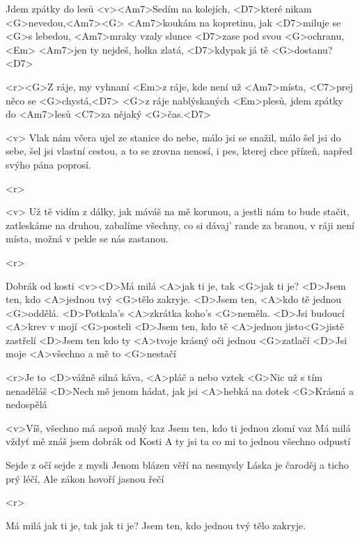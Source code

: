 \begin{song}{79}{Jdem zpátky do lesů}{}
	<v><Am7>Sedím na kolejích, <D7>které nikam <G>nevedou,<Am7><G>
	<Am7>koukám na kopretinu, jak <D7>miluje se <G>s lebedou,
	<Am7>mraky vzaly slunce <D7>zase pod svou <G>ochranu,<Em>
	<Am7>jen ty nejdeš, holka zlatá, <D7>kdypak já tě <G>dostanu? <D7>

	<r><G>Z ráje, my vyhnaní <Em>z ráje,
	kde není už <Am7>místa, <C7>prej něco se <G>chystá,<D7>
	<G>z ráje nablýskaných <Em>plesů,
	jdem zpátky do <Am7>lesů <C7>za nějaký <G>čas.<D7>

	<v> Vlak nám včera ujel ze stanice do nebe,
	málo jsi se snažil, málo šel jsi do sebe,
	šel jsi vlastní cestou, a to se zrovna nenosí,
	i pes, kterej chce přízeň, napřed svýho pána poprosí.

	<r>

	<v> Už tě vidím z dálky, jak máváš na mě korunou,
	a jestli nám to bude stačit, zatleskáme na druhou,
	zabalíme všechny, co si dávaj' rande za branou,
	v ráji není místa, možná v pekle se nás zastanou.

	<r>
\end{song}

\begin{song}[Chinaski]{82}{Dobrák od kosti}{}
	<v><D>Má milá <A>jak ti je, tak <G>jak ti je?
	<D>Jsem ten, kdo <A>jednou tvý <G>tělo zakryje.
	<D>Jsem ten, <A>kdo tě jednou <G>oddělá.
	<D>Potkala's <A>zkrátka koho's <G>neměla.
	<D>Jsi budoucí <A>krev v mojí <G>posteli
	<D>Jsem ten, kdo tě <A>jednou jisto<G>jistě zastřelí
	<D>Jsem ten kdo ty <A>tvoje krásný oči jednou <G>zatlačí
	<D>Jsi moje <A>všechno a mě to <G>nestačí

	<r>Je to <D>vážně silná káva, <A>pláč a nebo vztek
	<G>Nic už s tím nenaděláš
	<D>Nech mě jenom hádat, jak jsi <A>hebká na dotek
	<G>Krásná a nedospělá

	<v>Víš, všechno má aspoň malý kaz
	Jsem ten, kdo ti jednou zlomí vaz
	Má milá vždyť mě znáš jsem dobrák od Kosti
	A ty jsi ta co mi to jednou všechno odpustí

	Sejde z očí sejde z mysli
	Jenom blázen věří na nesmysly
	Láska je čaroděj a ticho prý léčí,
	Ale zákon hovoří jasnou řečí

	<r>

	Má milá jak ti je, tak jak ti je?
	Jsem ten, kdo jednou tvý tělo zakryje.
\end{song}

